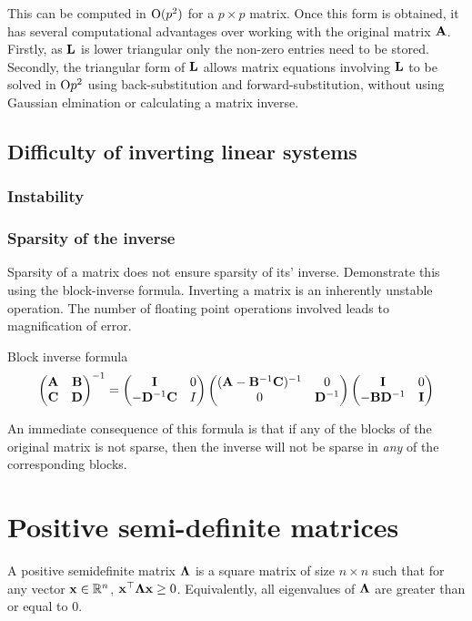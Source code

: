 \documentclass{amsart}[12pt]
\begin{document}
This can be computed in $\text{O}(p^2)$ for a $p \times p$ matrix. Once this form is obtained, it has several
computational advantages over working with the original matrix ${\bf A}$. Firstly, as ${\bf L}$ is lower triangular
only the non-zero entries need to be stored. Secondly, the triangular form of ${\bf L}$ allows matrix equations
involving ${\bf L}$ to be solved in $\text{O}{p^2}$ using back-substitution and forward-substitution, without using
Gaussian elmination or calculating a matrix inverse.

\subsection{Difficulty of inverting linear systems}

\subsubsection{Instability}


\subsubsection{Sparsity of the inverse}
Sparsity of a matrix does not ensure sparsity of its' inverse. Demonstrate this using
the block-inverse formula. Inverting a matrix is an inherently unstable operation. The number of floating
point operations involved leads to magnification of error.

Block inverse formula \\
\[
	\begin{pmatrix}
	{\bf A} & {\bf B} \\
	{\bf C} & {\bf D}
	\end{pmatrix}^{-1}
	=
	\begin{pmatrix}
	{\bf I} & 0 \\
	-{\bf D}^{-1} {\bf C} & I
	\end{pmatrix}
	\begin{pmatrix}
	({\bf A} - {\bf B}^{-1}{\bf C})^{-1} & 0 \\
	0 & {\bf D}^{-1}
	\end{pmatrix}
	\begin{pmatrix}
	{\bf I} & 0 \\
	-{\bf B}{\bf D}^{-1} & {\bf I}
	\end{pmatrix}
\]

An immediate consequence of this formula is that if any of the blocks of the original matrix is not sparse,
then the inverse will not be sparse in \emph{any} of the corresponding blocks.

\section{Positive semi-definite matrices}
A positive semidefinite matrix ${\boldsymbol \Lambda}$ is a square matrix of size $n \times n$ such that for any vector
${\bf x} \in {\mathbb{R}}^n$, ${\bf x}^\top {\boldsymbol\Lambda} {\bf x} \geq 0$. Equivalently, all eigenvalues of ${\boldsymbol \Lambda}$ are greater than or 
equal to 0.
\end{document}
